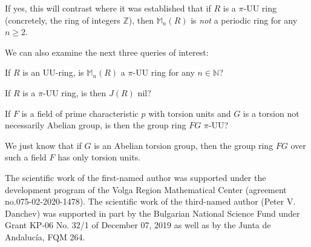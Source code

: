 \documentclass[12pt]{amsart}
\theoremstyle{definition}
\theoremstyle{remark}
\numberwithin{equation}{section}
\begin{document}
\medskip

If yes, this will contrast \cite[Example 2.9]{CD} where it was established that if $R$ is a $\pi$-UU ring (concretely, the ring of integers $\mathbb{Z}$), then $\mathbb{M}_n(R)$ is {\it not} a periodic ring for any $n\geq 2$.

\medskip

We can also examine the next three queries of interest:

\medskip

 If $R$ is an UU-ring, is $\mathbb{M}_n(R)$ a $\pi$-UU ring for any $n\in \mathbb{N}$?

\medskip

 If $R$ is a $\pi$-UU ring, is then $J(R)$ nil?

\medskip

 If $F$ is a field of prime characteristic $p$ with torsion units and $G$ is a torsion not necessarily Abelian group, is then the group ring $FG$ $\pi$-UU?

\medskip

We just know that if $G$ is an Abelian torsion group, then the group ring $FG$ over such a field $F$ has only torsion units.

\medskip

 The scientific work of the first-named author was supported under the development program of the Volga Region Mathematical Center (agreement no.075-02-2020-1478). The scientific work of the third-named author (Peter V. Danchev) was supported in part by the Bulgarian National Science Fund under Grant KP-06 No. 32/1 of December 07, 2019 as well as by the Junta de Andaluc\'ia, FQM 264.

\medskip


\vskip3.0pc
\end{document}

